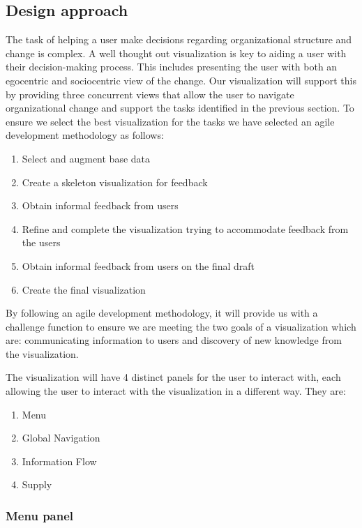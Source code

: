 \documentclass{soups}
\begin{document}
\subsection{Design approach}

The task of helping a user make decisions regarding organizational structure and change is complex.  A well thought out visualization is key to aiding a user with their decision-making process.  This includes presenting the user with both an egocentric and sociocentric view of the change.  Our visualization will support this by providing three concurrent views that allow the user to navigate organizational change and support the tasks identified in the previous section.  To ensure we select the best visualization for the tasks we have selected an agile development methodology as follows:

\begin{enumerate}
\item Select and augment base data
\item Create a skeleton visualization for feedback
\item Obtain informal feedback from users
\item Refine and complete the visualization trying to accommodate feedback from the users
\item Obtain informal feedback from users on the final draft
\item Create the final visualization
\end{enumerate}

By following an agile development methodology, it will provide us with a challenge function to ensure we are meeting the two goals of a visualization which are: communicating information to users and discovery of new knowledge from the visualization. 

The visualization will have 4 distinct panels for the user to interact with, each allowing the user to interact with the visualization in a different way. They are:
\begin{enumerate}
\item Menu
\item Global Navigation
\item Information Flow
\item Supply
\end{enumerate}

\subsubsection{Menu panel}
\end{document}
